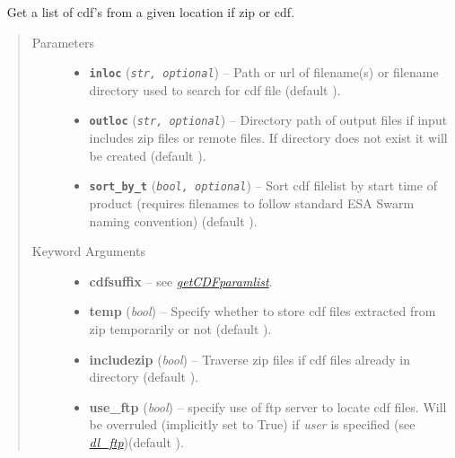 \documentclass[letterpaper,10pt,english]{sphinxhowto}
\begin{document}

\begin{fulllineitems}
\label{swtools_doc:swtools.getCDFlist}~\label{swtools_doc:getcdflist}
Get a list of cdf's from a given location if zip or cdf.
\begin{quote}\begin{description}
\item[{Parameters}] \leavevmode\begin{itemize}
\item {} 
\textbf{\texttt{inloc}} (\emph{\texttt{str, optional}}) -- Path or url of filename(s) or filename directory used to search
for cdf file (default ).

\item {} 
\textbf{\texttt{outloc}} (\emph{\texttt{str, optional}}) -- Directory path of output files if input includes zip files or
remote files. If directory does not exist it will be created
(default ).

\item {} 
\textbf{\texttt{sort\_by\_t}} (\emph{\texttt{bool, optional}}) -- Sort cdf filelist by start time of product (requires filenames
to follow standard ESA Swarm naming convention)
(default ).

\end{itemize}

\item[{Keyword Arguments}] \leavevmode\begin{itemize}
\item {} 
\textbf{cdfsuffix} --
see {\hyperref[swtools_doc:getcdfparamlist]{\emph{getCDFparamlist}}}.

\item {} 
\textbf{temp} (\emph{bool}) --
Specify whether to store cdf files extracted from zip
temporarily or not (default ).

\item {} 
\textbf{includezip} (\emph{bool}) --
Traverse zip files if cdf files already in directory
(default ).

\item {} 
\textbf{use\_ftp} (\emph{bool}) --
specify use of ftp server to locate cdf files. Will be
overruled (implicitly set to True) if \emph{user} is specified
(see {\hyperref[swtools_doc:dl\string-ftp]{\emph{dl\_ftp}}})(default ).


\end{itemize}
\end{description}
\end{quote}
\end{fulllineitems}
\end{document}
